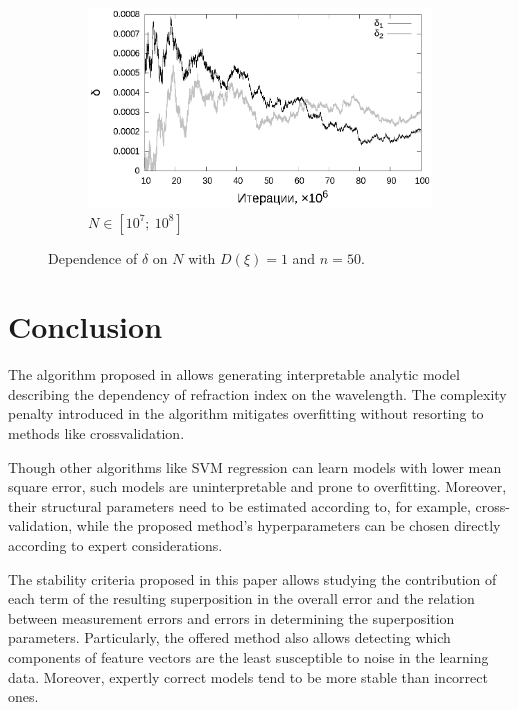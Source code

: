 \documentclass[11pt,a4paper]{article}
\theoremstyle{definition}
\begin{document}
\begin{figure}[h!]
\begin{subfigure}[b]{0.3\textwidth}
    \includegraphics[width=\textwidth]{figs/classic/linear_log_1x_2_samples_50_variance_1_norm.log_end.eps}
    \caption{$N \in [10^7;~10^8]$}
    \label{fig:classic_var1_n50_end}
  \end{subfigure}
  \caption{Dependence of $\delta$ on $N$ with $D(\xi) = 1$ and $n = 50$.}
  \label{fig:classic_var1_n50}
\end{figure}

\section{Conclusion}

The algorithm proposed in \cite{Rudoy13} allows generating interpretable analytic
model describing the dependency of refraction index on the wavelength. The complexity
penalty introduced in the algorithm mitigates overfitting without resorting to methods
like crossvalidation.

Though other algorithms like SVM regression can learn models with lower mean square error,
such models are uninterpretable and prone to overfitting. Moreover, their
structural parameters need to be estimated according to, for example,
cross-validation, while the proposed method's hyperparameters can be chosen directly
according to expert considerations.

The stability criteria proposed in this paper allows studying the contribution of each
term of the resulting superposition in the overall error
and the relation between measurement errors
and errors in determining the superposition parameters. Particularly, the offered method
also allows detecting which components of feature vectors are the least susceptible to
noise in the learning data. Moreover, expertly correct models tend to be more stable
than incorrect ones.

\FloatBarrier


%
%

\end{document}
